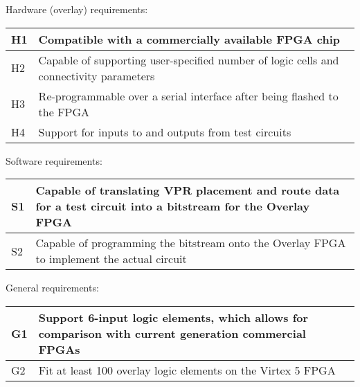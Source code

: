 Hardware (overlay) requirements:

\begin{tabular}{|p{1cm}|p{15cm}|}
\hline
H1 & Compatible with a commercially available FPGA chip\\ \hline
H2 & Capable of supporting user-specified number of logic cells and connectivity parameters \\ \hline
H3 & Re-programmable over a serial interface after being flashed to the FPGA \\ \hline
H4 & Support for inputs to and outputs from test circuits \\ \hline
\end{tabular}


Software requirements:

\begin{tabular}{|p{1cm}|p{15cm}|}
\hline
S1 & Capable of translating VPR placement and route data for a test circuit into a bitstream for the Overlay FPGA\\ \hline
S2 & Capable of programming the bitstream onto the Overlay FPGA to implement the actual circuit \\ \hline
\end{tabular}



General requirements:

\begin{tabular}{|p{1cm}|p{15cm}|}
\hline
G1 & Support 6-input logic elements, which allows for comparison with current generation commercial FPGAs\\ \hline
G2 & Fit at least 100 overlay logic elements on the Virtex 5 FPGA \\ \hline
\end{tabular}

